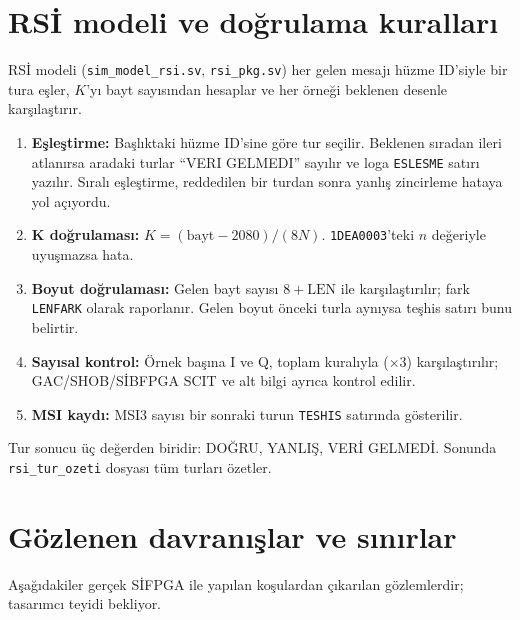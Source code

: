 \documentclass[11pt,a4paper]{article}
\newcommand{\kod}[1]{\texttt{#1}}
\begin{document}
\section{RSİ modeli ve doğrulama kuralları}

RSİ modeli (\kod{sim\_model\_rsi.sv}, \kod{rsi\_pkg.sv}) her gelen mesajı hüzme
ID'siyle bir tura eşler, $K$'yı bayt sayısından hesaplar ve her örneği beklenen
desenle karşılaştırır.

\begin{enumerate}[nosep]
  \item \textbf{Eşleştirme:} Başlıktaki hüzme ID'sine göre tur seçilir. Beklenen
        sıradan ileri atlanırsa aradaki turlar ``VERI GELMEDI'' sayılır ve loga
        \kod{ESLESME} satırı yazılır. Sıralı eşleştirme, reddedilen bir turdan
        sonra yanlış zincirleme hataya yol açıyordu.
  \item \textbf{K doğrulaması:} $K=(\text{bayt}-2080)/(8N)$. \kod{1DEA0003}'teki
        $n$ değeriyle uyuşmazsa hata.
  \item \textbf{Boyut doğrulaması:} Gelen bayt sayısı $8+\mathrm{LEN}$ ile
        karşılaştırılır; fark \kod{LENFARK} olarak raporlanır. Gelen boyut önceki
        turla aynıysa teşhis satırı bunu belirtir.
  \item \textbf{Sayısal kontrol:} Örnek başına I ve Q, toplam kuralıyla
        ($\times 3$) karşılaştırılır; GAC/SHOB/SİBFPGA SCIT ve alt bilgi ayrıca
        kontrol edilir.
  \item \textbf{MSI kaydı:} MSI3 sayısı bir sonraki turun \kod{TESHIS} satırında
        gösterilir.
\end{enumerate}

Tur sonucu üç değerden biridir: DOĞRU, YANLIŞ, VERİ GELMEDİ. Sonunda
\kod{rsi\_tur\_ozeti} dosyası tüm turları özetler.

\section{Gözlenen davranışlar ve sınırlar}
\label{sec:gozlem}

Aşağıdakiler gerçek SİFPGA ile yapılan koşulardan çıkarılan gözlemlerdir;
tasarımcı teyidi bekliyor.
\end{document}
